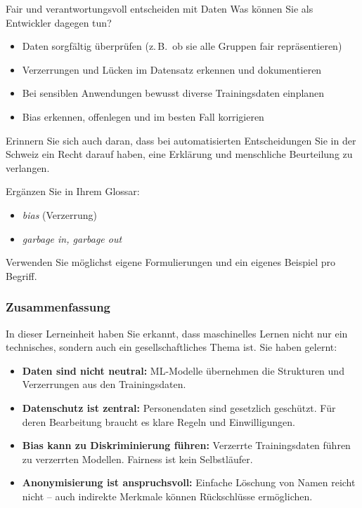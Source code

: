 \begin{lpu}{Fair und verantwortungsvoll entscheiden mit Daten}
Was können Sie als Entwickler dagegen tun?

\begin{itemize}
  \item Daten sorgfältig überprüfen (z.\,B.\ ob sie alle Gruppen fair repräsentieren)
  \item Verzerrungen und Lücken im Datensatz erkennen und dokumentieren
  \item Bei sensiblen Anwendungen bewusst diverse Trainingsdaten einplanen
  \item Bias erkennen, offenlegen und im besten Fall korrigieren
\end{itemize}

Erinnern Sie sich auch daran, dass bei automatisierten Entscheidungen Sie in der Schweiz ein Recht darauf haben, eine Erklärung und menschliche Beurteilung zu verlangen.

\begin{aufgabe}{7}
Ergänzen Sie in Ihrem Glossar:

\begin{itemize}
  \item \textit{bias} (Verzerrung)
  \item \textit{garbage in, garbage out}
\end{itemize}
Verwenden Sie möglichst eigene Formulierungen und ein eigenes Beispiel pro Begriff.
\end{aufgabe}

\subsubsection*{Zusammenfassung}

In dieser Lerneinheit haben Sie erkannt, dass maschinelles Lernen nicht nur ein technisches, sondern auch ein gesellschaftliches Thema ist. Sie haben gelernt:

\begin{itemize}
  \item \textbf{Daten sind nicht neutral:} ML-Modelle übernehmen die Strukturen und Verzerrungen aus den Trainingsdaten.
  \item \textbf{Datenschutz ist zentral:} Personendaten sind gesetzlich geschützt. Für deren Bearbeitung braucht es klare Regeln und Einwilligungen.
  \item \textbf{Bias kann zu Diskriminierung führen:} Verzerrte Trainingsdaten führen zu verzerrten Modellen. Fairness ist kein Selbstläufer.
  \item \textbf{Anonymisierung ist anspruchsvoll:} Einfache Löschung von Namen reicht nicht – auch indirekte Merkmale können Rückschlüsse ermöglichen.
\end{itemize}


\end{lpu}
